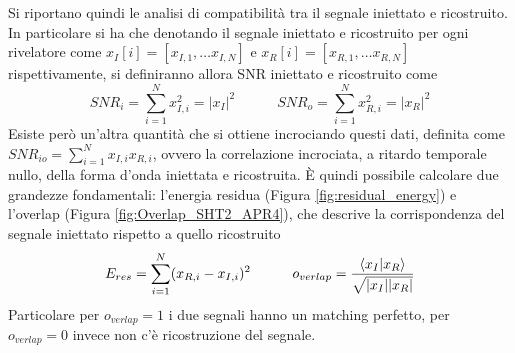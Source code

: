 Si riportano quindi le analisi di compatibilità tra il segnale iniettato e ricostruito. In particolare si ha che denotando il segnale iniettato e ricostruito per ogni rivelatore come $x_{I}[i]= [x_{I,1}, \dots x_{I,N}]$ e $x_{R}[i]= [x_{R,1}, \dots x_{R,N}]$ rispettivamente, si definiranno allora SNR iniettato e ricostruito come
\begin{equation}
	SNR_i = \sum_{i=1}^{N}x_{I, i}^2 = |x_{I}|^2 \quad\quad\quad SNR_o = \sum_{i=1}^{N}x_{R, i}^2 = |x_{R}|^2
	\label{eqn:iSNR_oSNR}
\end{equation} 
Esiste però un'altra quantità che si ottiene incrociando questi dati, definita come $SNR_{io} = \sum_{i=1}^{N}x_{I, i}x_{R, i}$, ovvero la correlazione incrociata, a ritardo temporale nullo, della forma d'onda iniettata e ricostruita\cite{cWB_Manual}. È quindi possibile calcolare due grandezze fondamentali: l'energia residua (Figura \ref{fig:residual_energy}) e l'overlap (Figura \ref{fig:Overlap_SHT2_APR4}), che descrive la corrispondenza del segnale iniettato rispetto a quello ricostruito
\begin{equation}
	E_{res}= \sum_{i=1}^{N}(x_{R, i}-x_{I, i})^2%
	\quad\quad\quad
	o_{verlap} = \frac{\braket{x_I}{x_R}}{\sqrt{|x_I||x_R|}}%
\end{equation}
Particolare per $o_{verlap}=1$ i due segnali hanno un matching perfetto, per $o_{verlap}=0$ invece non c'è ricostruzione del segnale.

